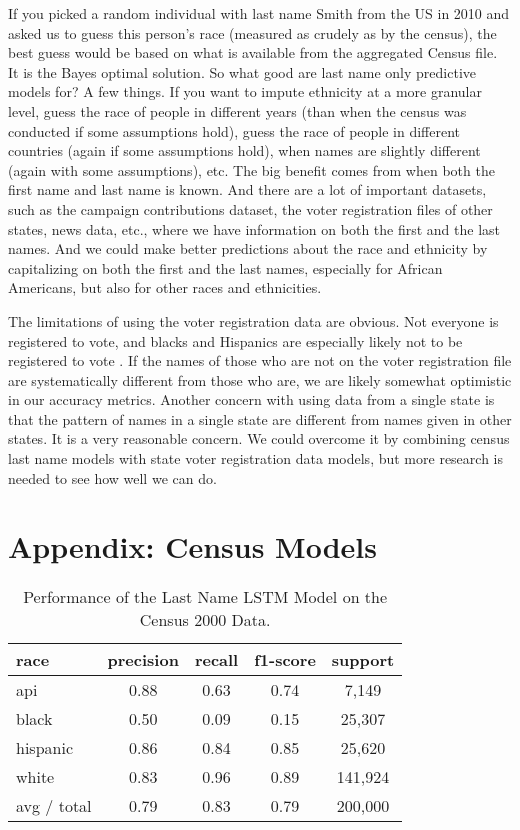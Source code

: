 \documentclass[12pt, letterpaper]{article}
\begin{document}
If you picked a random individual with last name Smith from the US in 2010 and asked us to guess this person's race (measured as crudely as by the census), the best guess would be based on what is available from the aggregated Census file. It is the Bayes optimal solution. So what good are last name only predictive models for? A few things. If you want to impute ethnicity at a more granular level, guess the race of people in different years (than when the census was conducted if some assumptions hold), guess the race of people in different countries (again if some assumptions hold), when names are slightly different (again with some assumptions), etc. The big benefit comes from when both the first name and last name is known. And there are a lot of important datasets, such as the campaign contributions dataset, the voter registration files of other states, news data, etc., where we have information on both the first and the last names. And we could make better predictions about the race and ethnicity by capitalizing on both the first and the last names, especially for African Americans, but also for other races and ethnicities.

The limitations of using the voter registration data are obvious. Not everyone is registered to vote, and blacks and Hispanics are especially likely not to be registered to vote \citep{ansolabehere2011gender}. If the names of those who are not on the voter registration file are systematically different from those who are, we are likely somewhat optimistic in our accuracy metrics. Another concern with using data from a single state is that the pattern of names in a single state are different from names given in other states. It is a very reasonable concern. We could overcome it by combining census last name models with state voter registration data models, but more research is needed to see how well we can do.

\clearpage



\section*{Appendix: Census Models}

\begin{table}[h!]
\centering
\caption{Performance of the Last Name LSTM Model on the Census 2000 Data.}
\begin{tabular}{ l c c c c }
\hline    
   race & precision & recall & f1-score & support\\
\hline
      api      &   0.88   &  0.63  &     0.74   & 7,149\\
      black    &   0.50   &  0.09  &     0.15   & 25,307\\
   hispanic    &   0.86   &  0.84  &     0.85   & 25,620\\
      white    &   0.83   &  0.96  &     0.89   & 141,924\\

avg / total    &   0.79   &   0.83   &   0.79 &   200,000\\
\hline
\end{tabular}
\label{table:last_name_census_2000}
\end{table}
\end{document}
